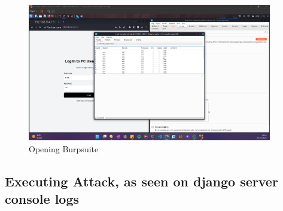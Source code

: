 \documentclass[11pt]{article}
\begin{document}
\begin{figure}[H]
    \centering
    \includegraphics[width=0.95\textwidth]{burpsuite (9).png}
    \caption{Opening Burpsuite}
    \label{fig:1}
\end{figure}
\subsection{Executing Attack, as seen on django server console logs}



\end{document}
